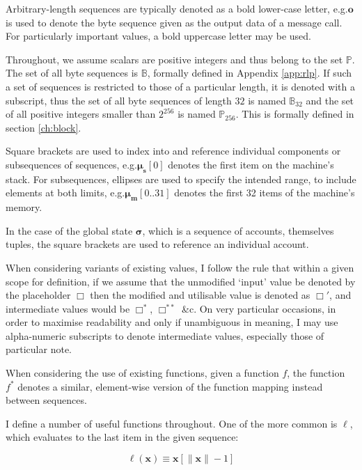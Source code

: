 \documentclass[9pt,oneside]{amsart}
\makeatletter
\newcommand*\eg{e.g.\@\xspace}
\makeatother
\begin{document}
\begin{multicols}{2}
Arbitrary-length sequences are typically denoted as a bold lower-case letter, \eg $\mathbf{o}$ is used to denote the byte sequence given as the output data of a message call. For particularly important values, a bold uppercase letter may be used.

Throughout, we assume scalars are positive integers and thus belong to the set $\mathbb{P}$. The set of all byte sequences is $\mathbb{B}$, formally defined in Appendix \ref{app:rlp}. If such a set of sequences is restricted to those of a particular length, it is denoted with a subscript, thus the set of all byte sequences of length $32$ is named $\mathbb{B}_{32}$ and the set of all positive integers smaller than $2^{256}$ is named $\mathbb{P}_{256}$. This is formally defined in section \ref{ch:block}.

Square brackets are used to index into and reference individual components or subsequences of sequences, \eg $\boldsymbol{\mu}_\mathbf{s}[0]$ denotes the first item on the machine's stack. For subsequences, ellipses are used to specify the intended range, to include elements at both limits, \eg $\boldsymbol{\mu}_\mathbf{m}[0..31]$ denotes the first 32 items of the machine's memory.

In the case of the global state $\boldsymbol{\sigma}$, which is a sequence of accounts, themselves tuples, the square brackets are used to reference an individual account.

When considering variants of existing values, I follow the rule that within a given scope for definition, if we assume that the unmodified `input' value be denoted by the placeholder $\Box$ then the modified and utilisable value is denoted as $\Box'$, and intermediate values would be $\Box^*$,  $\Box^{**}$ \&c. On very particular occasions, in order to maximise readability and only if unambiguous in meaning, I may use alpha-numeric subscripts to denote intermediate values, especially those of particular note.

When considering the use of existing functions, given a function $f$, the function \hyperlink{f*}{$f^*$} denotes a similar, element-wise version of the function mapping instead between sequences.

I define a number of useful functions throughout. \hypertarget{ell}{}One of the more common is $\ell$, which evaluates to the last item in the given sequence:

\begin{equation}
\ell(\mathbf{x}) \equiv \mathbf{x}[\lVert \mathbf{x} \rVert - 1]
\end{equation}


\end{multicols}
\end{document}
